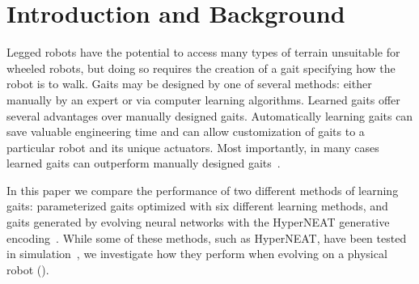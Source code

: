 \section{Introduction and Background}





Legged robots have the potential to access many types of terrain
unsuitable for wheeled robots, but doing so requires the creation of a
gait specifying how the robot is to walk.  Gaits may be designed
by one of several methods: either manually by an expert or
via computer learning algorithms.  Learned gaits
offer several advantages over manually designed gaits.  Automatically
learning gaits can save valuable engineering time and can allow
customization of gaits to a particular robot and its unique actuators.
Most importantly, in many cases learned gaits can outperform manually
designed gaits~\cite{hornby2005autonomous, valsalam2008modular}.

In this paper we compare the performance of two different methods of
learning gaits: parameterized gaits optimized with six different
learning methods, and gaits generated by evolving neural networks with
the HyperNEAT generative encoding~\cite{stanley2009hypercube}. While
some of these methods, such as HyperNEAT, have been tested in
simulation~\cite{clune2009evolving, clune2011performance}, we
investigate how they perform when evolving on a physical robot
().

